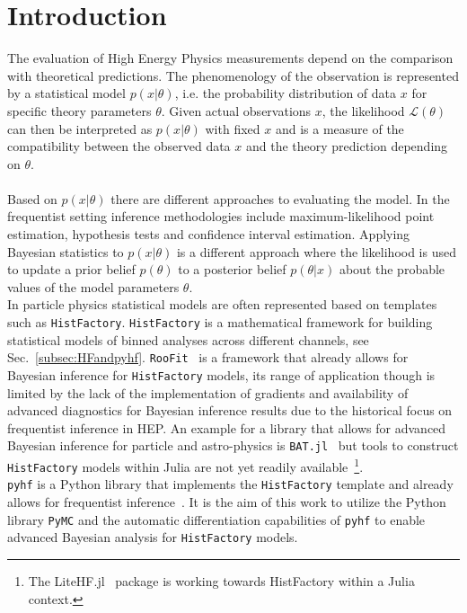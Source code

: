 \section{Introduction}\label{sec:introduction}

The evaluation of High Energy Physics measurements depend on the comparison with theoretical predictions. The phenomenology of the observation is represented by a statistical model $p(x | \theta)$, i.e. the probability distribution of data $x$ for specific theory parameters $\theta$.
Given actual observations $x$, the likelihood $\mathcal{L}(\theta)$ can then be interpreted as $p(x | \theta)$ with fixed $x$ and is a measure of the compatibility between the observed data $x$ and the theory prediction depending on $\theta$.\\ \\
Based on $p(x | \theta)$ there are different approaches to evaluating the model. In the frequentist setting inference methodologies include maximum-likelihood point estimation, hypothesis tests and confidence interval estimation. Applying Bayesian statistics to $p(x | \theta)$ is a different approach where the likelihood is used to update a prior belief $p(\theta)$ to a posterior belief $p(\theta|x)$ about the probable values of the model parameters $\theta$. \\
In particle physics statistical models are often represented based on templates such as \texttt{HistFactory}. \texttt{HistFactory} is a mathematical framework for building statistical models of binned analyses across different channels, see Sec.~\ref{subsec:HFandpyhf}. \texttt{RooFit}~\cite{root} is a framework that already allows for Bayesian inference for \texttt{HistFactory} models, its range of application though is limited by the lack of the implementation of gradients and availability of advanced diagnostics for Bayesian inference results due to the historical focus on frequentist inference in HEP. An example for a library that allows for advanced Bayesian inference for particle and astro-physics is \texttt{BAT.jl}~\cite{Schulz:2021BAT} but tools to construct \texttt{HistFactory} models within Julia are not yet readily available~\footnote{The LiteHF.jl~\cite{LiteHF} package is working towards HistFactory within a Julia context.}. \\
\texttt{pyhf} is a Python library that implements the \texttt{HistFactory} template and already allows for frequentist inference~\cite{pyhf, pyhf_joss}. It is the aim of this work to utilize the Python library \texttt{PyMC} and the automatic differentiation capabilities of \texttt{pyhf} to enable advanced Bayesian analysis for \texttt{HistFactory} models.
